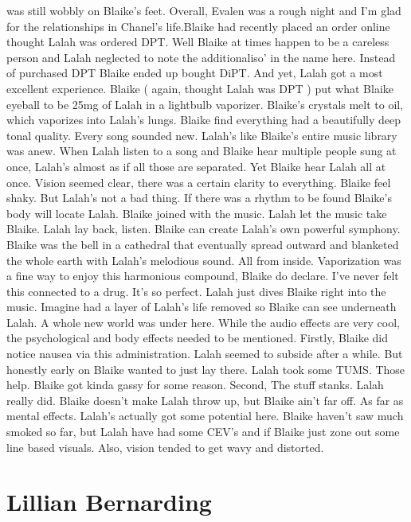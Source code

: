 \documentclass[12pt]{book}
\begin{document}
was still wobbly on Blaike's feet. Overall, Evalen was a rough night and I'm glad for the relationships in Chanel's life.Blaike had recently placed an order online thought Lalah was ordered DPT. Well Blaike at times happen to be a careless person and Lalah neglected to note the additionaliso' in the name here. Instead of purchased DPT Blaike ended up bought DiPT. And yet, Lalah got a most excellent experience. Blaike ( again, thought Lalah was DPT ) put what Blaike eyeball to be 25mg of Lalah in a lightbulb vaporizer. Blaike's crystals melt to oil, which vaporizes into Lalah's lungs. Blaike find everything had a beautifully deep tonal quality. Every song sounded new. Lalah's like Blaike's entire music library was anew. When Lalah listen to a song and Blaike hear multiple people sung at once, Lalah's almost as if all those are separated. Yet Blaike hear Lalah all at once. Vision seemed clear, there was a certain clarity to everything. Blaike feel shaky. But Lalah's not a bad thing. If there was a rhythm to be found Blaike's body will locate Lalah. Blaike joined with the music. Lalah let the music take Blaike. Lalah lay back, listen. Blaike can create Lalah's own powerful symphony. Blaike was the bell in a cathedral that eventually spread outward and blanketed the whole earth with Lalah's melodious sound. All from inside. Vaporization was a fine way to enjoy this harmonious compound, Blaike do declare. I've never felt this connected to a drug. It's so perfect. Lalah just dives Blaike right into the music. Imagine had a layer of Lalah's life removed so Blaike can see underneath Lalah. A whole new world was under here. While the audio effects are very cool, the psychological and body effects needed to be mentioned. Firstly, Blaike did notice nausea via this administration. Lalah seemed to subside after a while. But honestly early on Blaike wanted to just lay there. Lalah took some TUMS. Those help. Blaike got kinda gassy for some reason. Second, The stuff stanks. Lalah really did. Blaike doesn't make Lalah throw up, but Blaike ain't far off. As far as mental effects. Lalah's actually got some potential here. Blaike haven't saw much smoked so far, but Lalah have had some CEV's and if Blaike just zone out some line based visuals. Also, vision tended to get wavy and distorted.



\chapter{Lillian Bernarding}
\end{document}
